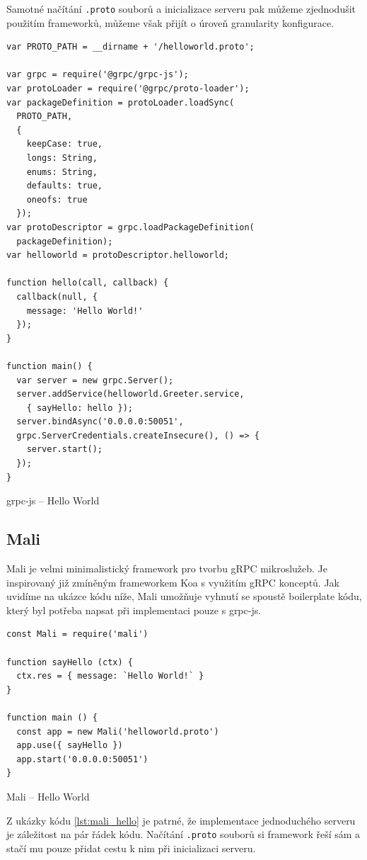 \documentclass[thesis=M,czech]{FITthesis}[2019/12/23]
\begin{document}
Samotné načítání \texttt{.proto} souborů a inicializace serveru pak můžeme zjednodušit použitím frameworků, můžeme však přijít o úroveň granularity konfigurace.

\begin{listing}[h]
\begin{verbatim}
var PROTO_PATH = __dirname + '/helloworld.proto';

var grpc = require('@grpc/grpc-js');
var protoLoader = require('@grpc/proto-loader');
var packageDefinition = protoLoader.loadSync(
  PROTO_PATH,
  {
    keepCase: true,
    longs: String,
    enums: String,
    defaults: true,
    oneofs: true
  });
var protoDescriptor = grpc.loadPackageDefinition(
  packageDefinition);
var helloworld = protoDescriptor.helloworld;

function hello(call, callback) {
  callback(null, {
    message: 'Hello World!'
  });
}

function main() {
  var server = new grpc.Server();
  server.addService(helloworld.Greeter.service,
    { sayHello: hello });
  server.bindAsync('0.0.0.0:50051', 
  grpc.ServerCredentials.createInsecure(), () => {
    server.start();
  });
}
\end{verbatim}
\caption{grpc-js -- Hello World}
\label{lst:grpcjs_hello}
\end{listing}

\subsection{Mali}
Mali \cite{mali} je velmi minimalistický framework pro tvorbu gRPC mikroslužeb. Je inspirovaný již zmíněným frameworkem Koa s využitím gRPC konceptů. Jak uvidíme na ukázce kódu níže, Mali umožňuje vyhnutí se spoustě boilerplate kódu, který byl potřeba napsat při implementaci pouze s grpc-js.

\begin{listing}[h]
\begin{verbatim}
const Mali = require('mali')

function sayHello (ctx) {
  ctx.res = { message: `Hello World!` }
}

function main () {
  const app = new Mali('helloworld.proto')
  app.use({ sayHello })
  app.start('0.0.0.0:50051')
}
\end{verbatim}
\caption{Mali -- Hello World}
\label{lst:mali_hello}
\end{listing}

Z ukázky kódu \ref{lst:mali_hello} je patrné, že implementace jednoduchého serveru je záležitost na pár řádek kódu. Načítání \texttt{.proto} souborů si framework řeší sám a stačí mu pouze přidat cestu k nim při inicializaci serveru.
\end{document}
